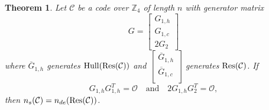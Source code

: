 \documentclass{article}
\newtheorem{theorem}{Theorem}[section]
\theoremstyle{definition}
\theoremstyle{remark}
\begin{document}
\begin{theorem}\label{Z4embeddingres}
Let $\mathcal C$ be a code over $\mathbb Z_4$ of length $n$ with generator matrix
\[
    G=
    \begin{bmatrix}
        G_{1, h}\\
        G_{1, c}\\
        2G_2
    \end{bmatrix}
\]
where $\overline{G}_{1, h}$ generates ${\rm{Hull}}({\rm Res}(\mathcal{C}))$ and $\begin{bmatrix}
        \overline{G}_{1, h}\\
        \overline{G}_{1, c}\\
    \end{bmatrix}$ generates ${\rm Res}(\mathcal{C})$.
If
\begin{equation}\label{lifthy}
    G_{1, h}G_{1, h}^T=\mathcal{O}\quad\mbox{and}\quad 2G_{1, h}G_2^T=\mathcal{O},
\end{equation}
then $n_s(\mathcal{C})=n_{de}({\rm Res}(\mathcal{C}))$.
\end{theorem}
\end{document}
